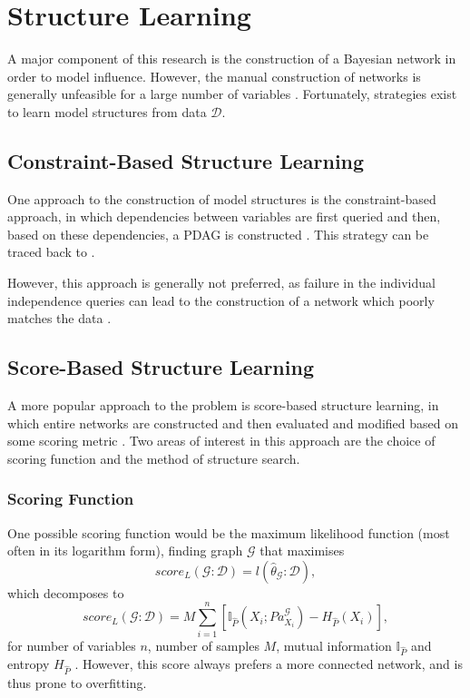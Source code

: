 \documentclass [11pt]{article}
\begin{document}
\section{Structure Learning}\label{StructureLearning}
A major component of this research is the construction of a Bayesian network in order to model influence. However, the manual construction of networks is generally unfeasible for a large number of variables \citep{koller09}. Fortunately, strategies exist to learn model structures from data $\mathcal{D}$.
\subsection{Constraint-Based Structure Learning}\label{ConstraintBasedStructureLearning}
One approach to the construction of model structures is the constraint-based approach, in which dependencies between variables are first queried and then, based on these dependencies, a PDAG is constructed \citep{koller09}. This strategy can be traced back to \citet{verma91}. 

However, this approach is generally not preferred, as failure in the individual independence queries can lead to the construction of a network which poorly matches the data \citep{koller09}.
\subsection{Score-Based Structure Learning}\label{ScoreBasedStructureLearning}
A more popular approach to the problem is score-based structure learning, in which entire networks are constructed and then evaluated and modified based on some scoring metric \citep{koller09}. Two areas of interest in this approach are the choice of scoring function and the method of structure search.
\subsubsection{Scoring Function}
One possible scoring function would be the maximum likelihood function (most often in its logarithm form), finding graph $\mathcal{G}$ that maximises
\begin{equation*}
score_{L}(\mathcal{G}:\mathcal{D}) = l(\hat{\theta}_{\mathcal{G}}:\mathcal{D}),
\end{equation*}
which decomposes to
\begin{equation*}
score_{L}(\mathcal{G}:\mathcal{D}) = M\sum_{i=1}^{n}[\mathbb{I}_{\hat{P}}(X_{i};Pa_{X_{i}}^{\mathcal{G}})-H_{\hat{P}}(X_{i})],
\end{equation*}
for number of variables $n$, number of samples $M$, mutual information $\mathbb{I}_{\hat{P}}$ and entropy $H_{\hat{P}}$ \citep{koller09}. However, this score always prefers a more connected network, and is thus prone to overfitting.
\end{document}
